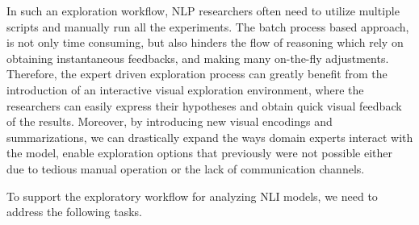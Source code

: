 In such an exploration workflow, NLP researchers often need to utilize multiple scripts and manually run all the experiments. The batch process based approach, is not only time consuming, but also hinders the flow of reasoning which rely on obtaining instantaneous feedbacks, and making many on-the-fly adjustments.
%
Therefore, the expert driven exploration process can greatly benefit from the introduction of an interactive visual exploration environment, where the researchers can easily express their hypotheses and obtain quick visual feedback of the results.
%
Moreover, by introducing new visual encodings and summarizations, we can drastically expand the ways domain experts interact with the model, enable exploration options that previously were not possible either due to tedious manual operation or the lack of communication channels.

%
To support the exploratory workflow for analyzing NLI models, we need to address the following tasks.

